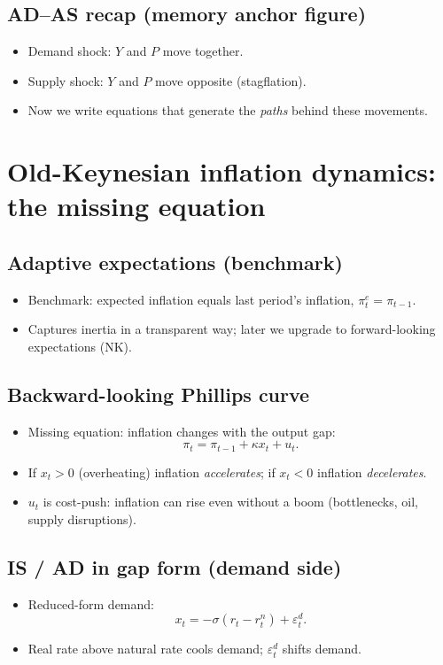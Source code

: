 \documentclass[11pt]{article}
\begin{document}
\subsection*{AD--AS recap (memory anchor figure)}
\begin{itemize}
\item Demand shock: $Y$ and $P$ move together.
\item Supply shock: $Y$ and $P$ move opposite (stagflation).
\item Now we write equations that generate the \emph{paths} behind these movements.
\end{itemize}

\section{Old-Keynesian inflation dynamics: the missing equation}

\subsection*{Adaptive expectations (benchmark)}
\begin{itemize}
\item Benchmark: expected inflation equals last period's inflation, $\pi_t^e=\pi_{t-1}$.
\item Captures inertia in a transparent way; later we upgrade to forward-looking expectations (NK).
\end{itemize}

\subsection*{Backward-looking Phillips curve}
\begin{itemize}
\item Missing equation: inflation changes with the output gap:
\[
\pi_t=\pi_{t-1}+\kappa x_t+u_t.
\]
\item If $x_t>0$ (overheating) inflation \emph{accelerates}; if $x_t<0$ inflation \emph{decelerates}.
\item $u_t$ is cost-push: inflation can rise even without a boom (bottlenecks, oil, supply disruptions).
\end{itemize}

\subsection*{IS / AD in gap form (demand side)}
\begin{itemize}
\item Reduced-form demand:
\[
x_t=-\sigma(r_t-r_t^{n})+\varepsilon_t^{d}.
\]
\item Real rate above natural rate cools demand; $\varepsilon_t^{d}$ shifts demand.
\end{itemize}
\end{document}
